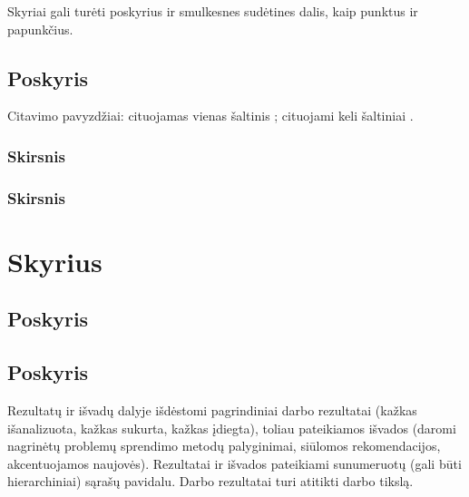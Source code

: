 \documentclass{VUMIFPSbakalaurinis}
\begin{document}
    Skyriai gali turėti poskyrius ir smulkesnes sudėtines dalis, kaip punktus ir
    papunkčius.
    
    \subsection{Poskyris}
    Citavimo pavyzdžiai: cituojamas vienas šaltinis \cite{PvzStraipsnLt}; cituojami
    keli šaltiniai \cite{PvzStraipsnEn, PvzKonfLt, PvzKonfEn, PvzKnygLt, PvzKnygEn,
    PvzElPubLt, PvzElPubEn, PvzMagistrLt, PvzPhdEn}.
    
    \subsubsection{Skirsnis}
    \subsubsection{Skirsnis}
    \section{Skyrius}
    \subsection{Poskyris}
    \subsection{Poskyris}
    
    Rezultatų ir išvadų dalyje išdėstomi pagrindiniai darbo rezultatai (kažkas
    išanalizuota, kažkas sukurta, kažkas įdiegta), toliau pateikiamos išvados
    (daromi nagrinėtų problemų sprendimo metodų palyginimai, siūlomos
    rekomendacijos, akcentuojamos naujovės). Rezultatai ir išvados pateikiami
    sunumeruotų (gali būti hierarchiniai) sąrašų pavidalu. Darbo rezultatai turi
    atitikti darbo tikslą.
    
    \printbibliography[heading=bibintoc]  %
    
\end{document}

